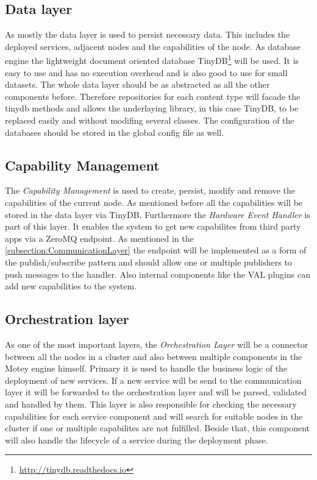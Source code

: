 \subsection{Data layer}
As mostly the data layer is used to persist necessary data.
This includes the deployed services, adjacent nodes and the capabilities of the node.
As database engine the lightweight document oriented database TinyDB\footnote{\url{http://tinydb.readthedocs.io}} will be used.
It is easy to use and has no execution overhead and is also good to use for small datasets.
The whole data layer should be as abstracted as all the other components before.
Therefore repositories for each content type will facade the tinydb methods and allows the underlaying library, in this case TinyDB, to be replaced easily and
without modifing several classes.
The configuration of the databases should be stored in the global config file as well.

\subsection{Capability Management}
The \textit{Capability Management} is used to create, persist, modify and remove the capabilities of the current node.
As mentioned before all the capabilities will be stored in the data layer via TinyDB.
Furthermore the \textit{Hardware Event Handler} is part of this layer.
It enables the system to get new capabilites from third party apps via a ZeroMQ endpoint.
As mentioned in the \ref{subsection:CommunicationLayer} the endpoint will be implemented as a form of the publish/subscribe pattern and should allow one or multiple publishers to push messages to the handler.
Also internal components like the \ac{VAL} plugins can add new capabilities to the system.

\subsection{Orchestration layer}
As one of the most important layers, the \textit{Orchestration Layer} will be a connector between all the nodes in a cluster and also between multiple components in the Motey engine himself.
Primary it is used to handle the business logic of the deployment of new services.
If a new service will be send to the communication layer it will be forwarded to the orchestration layer and will be parsed, validated and handled by them.
This layer is also responsible for checking the necessary capabilities for each service component and will search for suitable nodes in the cluster if one or multiple capabilites are not fulfilled.
Beside that, this component will also handle the lifecycle of a service during the deployment phase.

